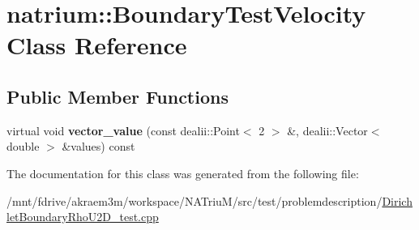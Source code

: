 \hypertarget{classnatrium_1_1BoundaryTestVelocity}{
\section{natrium::BoundaryTestVelocity Class Reference}
\label{classnatrium_1_1BoundaryTestVelocity}
}
\subsection*{Public Member Functions}
\begin{DoxyCompactItemize}
\item 
\hypertarget{classnatrium_1_1BoundaryTestVelocity_a79517bd2413986c38f4e944faea57a48}{
virtual void {\bfseries vector\_\-value} (const dealii::Point$<$ 2 $>$ \&, dealii::Vector$<$ double $>$ \&values) const }
\label{classnatrium_1_1BoundaryTestVelocity_a79517bd2413986c38f4e944faea57a48}

\end{DoxyCompactItemize}


The documentation for this class was generated from the following file:\begin{DoxyCompactItemize}
\item 
/mnt/fdrive/akraem3m/workspace/NATriuM/src/test/problemdescription/\hyperlink{DirichletBoundaryRhoU2D__test_8cpp}{DirichletBoundaryRhoU2D\_\-test.cpp}\end{DoxyCompactItemize}
